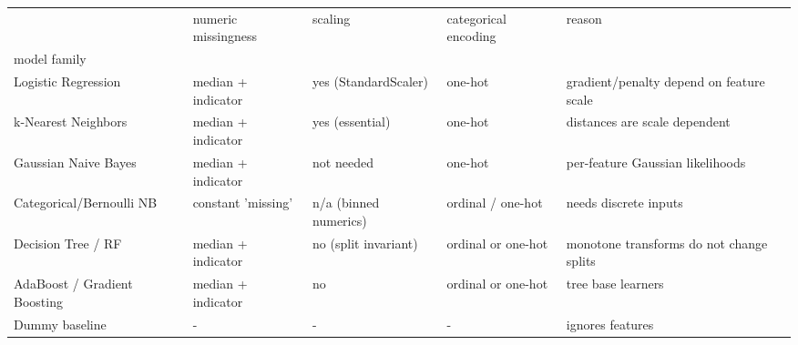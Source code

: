 \begin{tabular}{lllll}
\toprule
 & numeric missingness & scaling & categorical encoding & reason \\
model family &  &  &  &  \\
\midrule
Logistic Regression & median + indicator & yes (StandardScaler) & one-hot & gradient/penalty depend on feature scale \\
k-Nearest Neighbors & median + indicator & yes (essential) & one-hot & distances are scale dependent \\
Gaussian Naive Bayes & median + indicator & not needed & one-hot & per-feature Gaussian likelihoods \\
Categorical/Bernoulli NB & constant 'missing' & n/a (binned numerics) & ordinal / one-hot & needs discrete inputs \\
Decision Tree / RF & median + indicator & no (split invariant) & ordinal or one-hot & monotone transforms do not change splits \\
AdaBoost / Gradient Boosting & median + indicator & no & ordinal or one-hot & tree base learners \\
Dummy baseline & - & - & - & ignores features \\
\bottomrule
\end{tabular}
